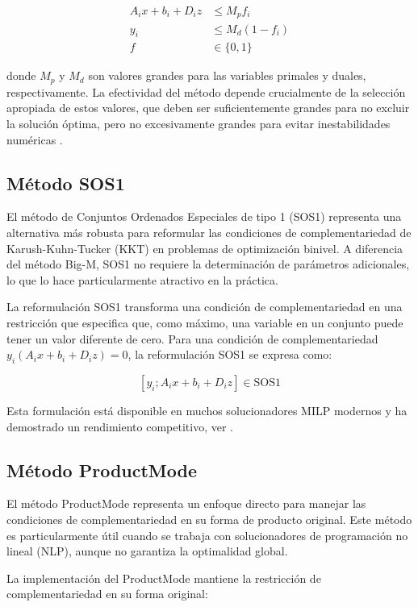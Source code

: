 \begin{align*}
A_ix + b_i + D_iz &\leq M_p f_i \\
y_i &\leq M_d(1 - f_i) \\
f &\in \{0,1\}
\end{align*}

donde $M_p$ y $M_d$ son valores grandes para las variables primales y duales, respectivamente. La efectividad del método depende crucialmente de la selección apropiada de estos valores, que deben ser suficientemente grandes para no excluir la solución óptima, pero no excesivamente grandes para evitar inestabilidades numéricas \cite{BilevelJump}.

\subsection{Método SOS1}

El método de Conjuntos Ordenados Especiales de tipo 1 (SOS1) representa una alternativa más robusta para reformular las condiciones de complementariedad de Karush-Kuhn-Tucker (KKT) en problemas de optimización binivel. A diferencia del método Big-M, SOS1 no requiere la determinación de parámetros adicionales, lo que lo hace particularmente atractivo en la práctica.

La reformulación SOS1 transforma una condición de complementariedad en una restricción que especifica que, como máximo, una variable en un conjunto puede tener un valor diferente de cero. Para una condición de complementariedad $y_i(A_ix + b_i + D_iz) = 0$, la reformulación SOS1 se expresa como:

\[ [y_i ; A_ix + b_i + D_iz] \in \text{SOS1} \]

Esta formulación está disponible en muchos solucionadores MILP modernos y ha demostrado un rendimiento competitivo, ver \cite{BilevelJump}.

\subsection{Método ProductMode}

El método ProductMode representa un enfoque directo para manejar las condiciones de complementariedad en su forma de producto original. Este método es particularmente útil cuando se trabaja con solucionadores de programación no lineal (NLP), aunque no garantiza la optimalidad global.

La implementación del ProductMode mantiene la restricción de complementariedad en su forma original:

